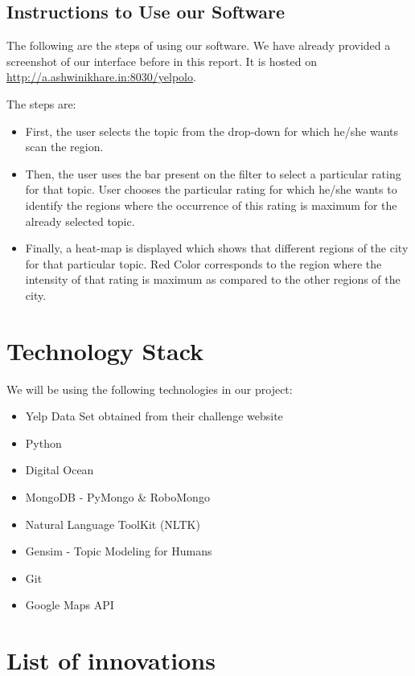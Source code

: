 \documentclass[12pt]{article} %
\begin{document}
\subsection{Instructions to Use our Software}

The following are the steps of using our software. We have already provided a screenshot of our interface before in this report. It is hosted on \href{http://a.ashwinikhare.in:8030/yelpolo}{http://a.ashwinikhare.in:8030/yelpolo}.

The steps are:

\begin{itemize}
\item First, the user selects the topic from the drop-down for which he/she wants scan the region.
\item Then, the user uses the bar present on the filter to select a particular rating for that topic. User chooses the particular rating for which he/she wants to identify the regions where the occurrence of this rating is maximum for the already selected topic.
\item Finally, a heat-map is displayed which shows that different regions of the city for that particular topic. Red Color corresponds to the region where the intensity of that rating is maximum as compared to the other regions of the city.
\end{itemize}

\section{Technology Stack}

We will be using the following technologies in our project:
\begin{itemize}
\item Yelp Data Set obtained from their challenge website
\item Python
\item Digital Ocean
\item MongoDB - PyMongo \& RoboMongo
\item Natural Language ToolKit (NLTK)
\item Gensim - Topic Modeling for Humans
\item Git
\item Google Maps API
\end{itemize}

\section{List of innovations}
\end{document}
